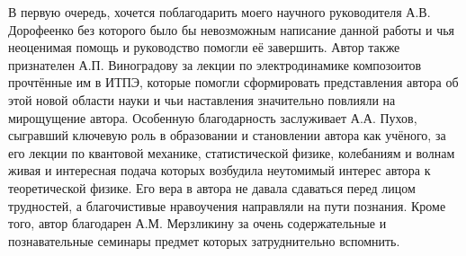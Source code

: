 В первую очередь, хочется поблагодарить моего научного руководителя А.В. Дорофеенко без которого было бы невозможным написание данной работы и чья неоценимая помощь и руководство помогли её завершить. Автор также признателен А.П. Виноградову за лекции по электродинамике композоитов прочтённые им в ИТПЭ, которые помогли сформировать представления автора об этой новой области науки и чьи наставления значительно повлияли на мирощущение автора. Особенную благодарность заслуживает А.А. Пухов, сыгравший ключевую роль в образовании и становлении автора как учёного, за его лекции по квантовой механике, статистической физике, колебаниям и волнам живая и интересная подача которых возбудила неутомимый интерес автора к теоретической физике. Его вера в автора не давала сдаваться перед лицом трудностей, а благочистивые нравоучения направляли на пути познания. Кроме того, автор благодарен А.М. Мерзликину
за очень содержательные и познавательные семинары предмет которых затруднительно вспомнить. 


\pagebreak[4]